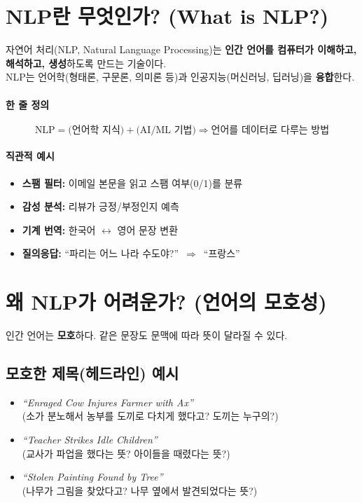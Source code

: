 \documentclass[12pt]{article}
\begin{document}
\section{NLP란 무엇인가? (What is NLP?)}
자연어 처리(NLP, Natural Language Processing)는 \textbf{인간 언어를 컴퓨터가 이해하고, 해석하고, 생성}하도록 만드는 기술이다.\\
NLP는 언어학(형태론, 구문론, 의미론 등)과 인공지능(머신러닝, 딥러닝)을 \textbf{융합}한다.

\paragraph{한 줄 정의}
\[
\text{NLP} = \text{(언어학 지식)} + \text{(AI/ML 기법)} \Rightarrow \text{언어를 데이터로 다루는 방법}
\]

\paragraph{직관적 예시}
\begin{itemize}
  \item \textbf{스팸 필터:} 이메일 본문을 읽고 스팸 여부(0/1)를 분류
  \item \textbf{감성 분석:} 리뷰가 긍정/부정인지 예측
  \item \textbf{기계 번역:} 한국어 $\leftrightarrow$ 영어 문장 변환
  \item \textbf{질의응답:} ``파리는 어느 나라 수도야?'' \,$\Rightarrow$\, ``프랑스''
\end{itemize}

\section{왜 NLP가 어려운가? (언어의 모호성)}
인간 언어는 \textbf{모호}하다. 같은 문장도 문맥에 따라 뜻이 달라질 수 있다.

\subsection*{모호한 제목(헤드라인) 예시}
\begin{itemize}
  \item \textit{``Enraged Cow Injures Farmer with Ax''} \\
        (소가 분노해서 농부를 도끼로 다치게 했다고? 도끼는 누구의?)
  \item \textit{``Teacher Strikes Idle Children''} \\
        (교사가 파업을 했다는 뜻? 아이들을 때렸다는 뜻?)
  \item \textit{``Stolen Painting Found by Tree''} \\
        (나무가 그림을 찾았다고? 나무 옆에서 발견되었다는 뜻?)
\end{itemize}
\end{document}
